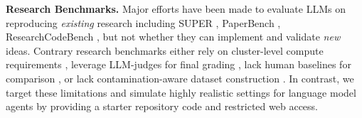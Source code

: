 \documentclass[11pt]{article}
\let\cite\citep
\newcommand{\kw}[1]{{\textsc{\MakeLowercase{#1}}}}
\theoremstyle{plain}
\theoremstyle{definition}
\theoremstyle{remark}
\begin{document}



\textbf{Research Benchmarks.} 
Major efforts have been made to evaluate LLMs on reproducing \emph{existing} research including SUPER \cite{bogin-etal-2024-super}, PaperBench \cite{starace2025paperbench}, ResearchCodeBench \cite{hua2025researchcodebenchbenchmarkingllmsimplementing}, but not whether they can implement and validate \emph{new} ideas. Contrary research benchmarks either rely on cluster-level compute requirements \cite{wijk2025rebench, wu2025innovatorbenchevaluatingagentsability, nathani2025mlgymnewframeworkbenchmark}, leverage LLM-judges for final grading \cite{chen2025mlrbenchevaluatingaiagents, bragg2025astabench}, lack human baselines for comparison \cite{nathani2025mlgymnewframeworkbenchmark, bragg2025astabench}, or lack contamination-aware dataset construction \cite{wu2025innovatorbenchevaluatingagentsability, nathani2025mlgymnewframeworkbenchmark}. In contrast, we target these limitations and simulate highly realistic settings for language model agents by providing a starter repository code and restricted web access. 
\end{document}

